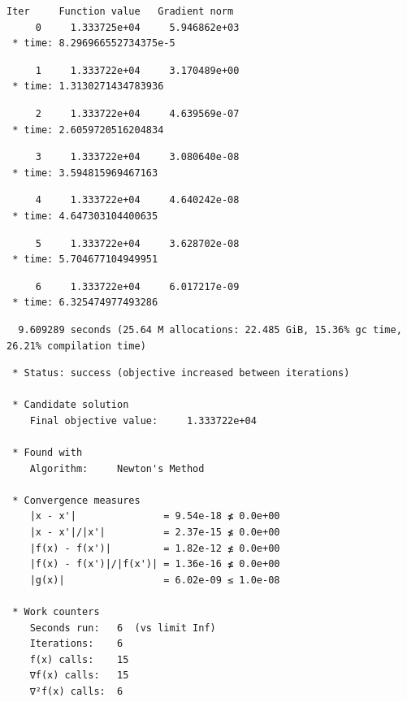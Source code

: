\documentclass[
  letterpaper,
  DIV=11,
  numbers=noendperiod]{scrreprt}
\begin{document}
\begin{verbatim}
Iter     Function value   Gradient norm 
     0     1.333725e+04     5.946862e+03
 * time: 8.296966552734375e-5
\end{verbatim}

\begin{verbatim}
     1     1.333722e+04     3.170489e+00
 * time: 1.3130271434783936
\end{verbatim}

\begin{verbatim}
     2     1.333722e+04     4.639569e-07
 * time: 2.6059720516204834
\end{verbatim}

\begin{verbatim}
     3     1.333722e+04     3.080640e-08
 * time: 3.594815969467163
\end{verbatim}

\begin{verbatim}
     4     1.333722e+04     4.640242e-08
 * time: 4.647303104400635
\end{verbatim}

\begin{verbatim}
     5     1.333722e+04     3.628702e-08
 * time: 5.704677104949951
\end{verbatim}

\begin{verbatim}
     6     1.333722e+04     6.017217e-09
 * time: 6.325474977493286
\end{verbatim}

\begin{verbatim}
  9.609289 seconds (25.64 M allocations: 22.485 GiB, 15.36% gc time, 26.21% compilation time)
\end{verbatim}

\begin{verbatim}
 * Status: success (objective increased between iterations)

 * Candidate solution
    Final objective value:     1.333722e+04

 * Found with
    Algorithm:     Newton's Method

 * Convergence measures
    |x - x'|               = 9.54e-18 ≰ 0.0e+00
    |x - x'|/|x'|          = 2.37e-15 ≰ 0.0e+00
    |f(x) - f(x')|         = 1.82e-12 ≰ 0.0e+00
    |f(x) - f(x')|/|f(x')| = 1.36e-16 ≰ 0.0e+00
    |g(x)|                 = 6.02e-09 ≤ 1.0e-08

 * Work counters
    Seconds run:   6  (vs limit Inf)
    Iterations:    6
    f(x) calls:    15
    ∇f(x) calls:   15
    ∇²f(x) calls:  6
\end{verbatim}
\end{document}
